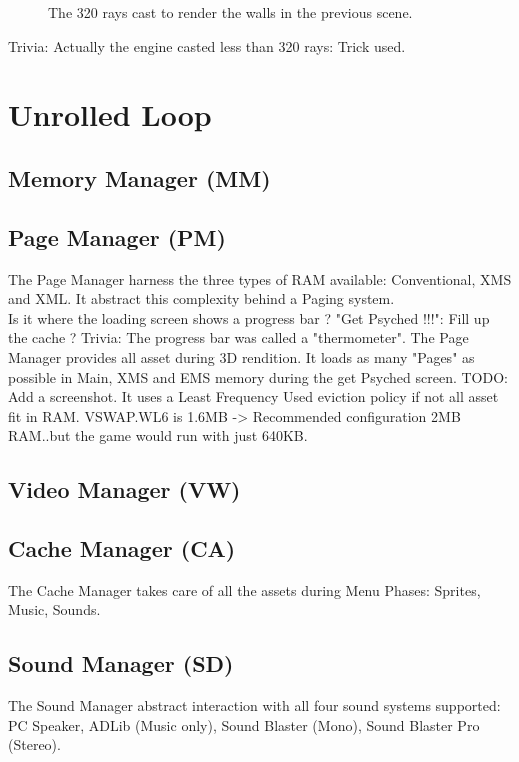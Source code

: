 \documentclass[book.tex]{subfiles}
\begin{document}
\begin{figure}[H]
\centering
 
 \caption{The 320 rays cast to render the walls in the previous scene.} \label{fig:Raycasting2}
\end{figure}
 
Trivia: Actually the engine casted less than 320 rays: Trick used.
 

\section{Unrolled Loop}

\subsection{Memory Manager (MM)}

\subsection{Page Manager (PM)}

The Page Manager harness the three types of RAM available: Conventional, XMS and XML. It abstract this complexity behind a Paging system.\\
Is it where the loading screen shows a progress bar ?
"Get Psyched !!!": Fill up the cache ?
Trivia: The progress bar was called a "thermometer".
The Page Manager provides all asset during 3D rendition. 
It loads as many "Pages" as possible in Main, XMS and EMS memory during the get Psyched screen.
TODO: Add a screenshot.
It uses a Least Frequency Used eviction policy if not all asset fit in RAM. VSWAP.WL6 is 1.6MB -> Recommended configuration 2MB RAM..but the game would run with just 640KB.
\subsection{Video Manager (VW)}


\subsection{Cache Manager (CA)}
The Cache Manager takes care of all the assets during Menu Phases: Sprites, Music, Sounds.
\subsection{Sound Manager (SD)}
The Sound Manager abstract interaction with all four sound systems supported: PC Speaker, ADLib (Music only), Sound Blaster (Mono), Sound Blaster Pro (Stereo).
\end{document}
